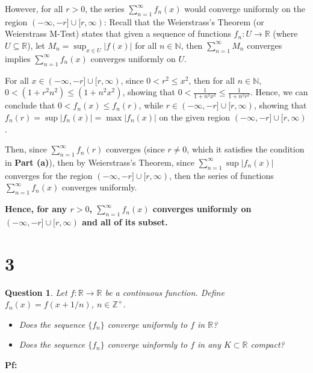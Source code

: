 \documentclass{article}
\newtheorem{question}{Question}
\begin{document}
\begin{itemize}
    However, for all $r>0$, the series $\sum_{n=1}^{\infty}f_n(x)$ would converge uniformly on the region $(-\infty,-r]\cup [r,\infty)$:
    Recall that the Weierstrass's Theorem (or Weierstrass M-Test) states that given a sequence of functions $f_n:U\rightarrow\mathbb{R}$ (where $U\subseteq \mathbb{R}$),
    let $M_n = \sup_{x\in U}|f(x)|$ for all $n\in\mathbb{N}$, then $\sum_{n=1}^{\infty}M_n$ converges implies $\sum_{n=1}^{\infty}f_n(x)$ converges uniformly on $U$.

    For all $x\in (-\infty,-r]\cup [r,\infty)$, since $0<r^2\leq x^2$, then for all $n\in\mathbb{N}$, $0<(1+r^2n^2)\leq (1+n^2x^2)$, showing that $0<\frac{1}{1+n^2x^2}\leq \frac{1}{1+n^2r^2}$.
    Hence, we can conclude that $0<f_n(x)\leq f_n(r)$, while $r\in (-\infty,-r]\cup [r,\infty)$, showing that $f_n(r)=\sup|f_n(x)| = \max|f_n(x)|$ on the given region $(-\infty,-r]\cup [r,\infty)$.

    Then, since $\sum_{n=1}^{\infty}f_n(r)$ converges (since $r\neq 0$, which it satisfies the condition in \textbf{Part (a)}), then by Weierstrass's Theorem, since $\sum_{n=1}^{\infty}\sup|f_n(x)|$ converges for the region $(-\infty,-r]\cup [r,\infty)$,
    then the series of functions $\sum_{n=1}^{\infty}f_n(x)$ converges uniformly.

    \textbf{Hence, for any $r>0$, $\sum_{n=1}^{\infty}f_n(x)$ converges uniformly on $(-\infty,-r]\cup [r,\infty)$ and all of its subset.}
\end{itemize}

\break

\section*{3}
\begin{myBox}[]{}
    \begin{question}
        Let $f:\mathbb{R}\rightarrow\mathbb{R}$ be a continuous function. Define $f_n(x)=f(x+1/n)$, $n\in\mathbb{Z}^+$.
        \begin{itemize}
            \item[(a)] Does the sequence $\{f_n\}$ converge uniformly to $f$ in $\mathbb{R}$?
            \item[(b)] Does the sequence $\{f_n\}$ converge uinformly to $f$ in any $K\subset \mathbb{R}$ compact? 
        \end{itemize}
    \end{question}
\end{myBox}

\textbf{Pf:}
\end{document}
